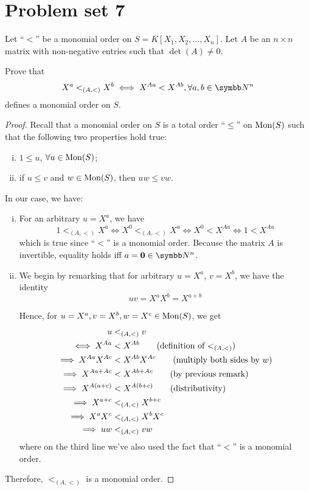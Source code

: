 \section*{Problem set 7}

\newcommand{\matorder}{<_{(A, <)}}
\newcommand{\revmatorder}{>_{(A, >)}}
\newcommand{\lexorder}{\ensuremath{<_\mathrm{Lex}}}
\newcommand{\degrevlexorder}{\ensuremath{<_\mathrm{DegRevLex}}}

\begin{problem}
Let ``\(<\)'' be a monomial order on \(S = K[X_1, X_2, \dots, X_n]\). Let \(A\) be an \(n \times n\) matrix with non-negative entries such that \(\det(A) \neq 0\).

Prove that
\[
    X^a \matorder X^b \iff X^{A a} < X^{A b}, \forall a, b \in \naturals^n
\]
defines a monomial order on \(S\).
\end{problem}
\begin{proof}
Recall that a monomial order on \(S\) is a total order ``\(\leq\)'' on \(\operatorname{Mon}(S)\) such that the following two properties hold true:
\begin{enumerate}[i)]
    \item \(1 \leq u\), \(\forall u \in \operatorname{Mon}(S)\);
    \item if \(u \leq v\) and \(w \in \operatorname{Mon}(S)\), then \(uw \leq vw\).
\end{enumerate}

In our case, we have:
\begin{enumerate}[i)]
    \item For an arbitrary \(u = X^a\), we have
    \[
        1 \matorder X^a \iff
        X^0 \matorder X^a \iff
        X^0 < X^{A a} \iff
        1 < X^{Aa}
    \]
    which is true since ``\(<\)'' is a monomial order. Because the matrix \(A\) is invertible, equality holds iff \(a = \mathbf{0} \in \naturals^n\).
    
    \item We begin by remarking that for arbitrary \(u = X^a\), \(v = X^b\), we have the identity
    \[
        uv = X^a X^b = X^{a + b}
    \]

    Hence, for \(u = X^a, v = X^b, w = X^c \in \operatorname{Mon}(S)\), we get
    \begin{align*}
        u &\matorder v \\
        \iff X^{A a} &< X^{A b} \tag{definition of \(\matorder\)} \\
        \implies X^{A a} X^{A c} &< X^{A b} X^{A c} \tag{multiply both sides by \(w\)} \\
        \implies X^{Aa + Ac} &< X^{Ab + Ac} \tag{by previous remark} \\
        \implies X^{A(a + c)} &< X^{A(b + c)} \tag{distributivity} \\
        \implies X^{a + c} &\matorder X^{b + c} \\
        \implies X^a X^c &\matorder X^b X^c \\
        \implies u w &\matorder v w
    \end{align*}
    where on the third line we've also used the fact that ``\(<\)'' is a monomial order. 
\end{enumerate}
Therefore, \(\matorder\) is a monomial order.
\end{proof}

